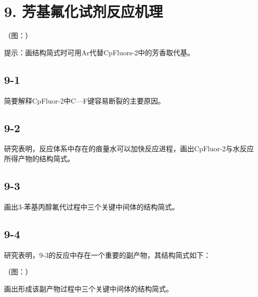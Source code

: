 \section*{9. 芳基氟化试剂反应机理}
（图：）

提⽰：画结构简式时可⽤Ar代替CpFluors-2中的芳⾹取代基。

\subsection*{9-1}
简要解释CpFluor-2中C—F键容易断裂的主要原因。

\subsection*{9-2}
研究表明，反应体系中存在的痕量⽔可以加快反应进程，画出CpFluor-2与⽔反应所得产物的结构简式。

\subsection*{9-3}
画出3-苯基丙醇氟代过程中三个关键中间体的结构简式。

\subsection*{9-4}
研究表明，9-3的反应中存在⼀个重要的副产物，其结构简式如下：

（图：）

画出形成该副产物过程中三个关键中间体的结构简式。
